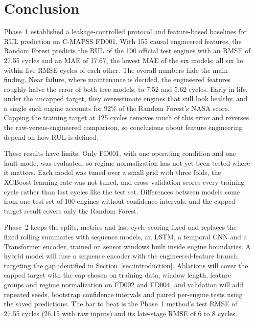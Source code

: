 
\section{Conclusion}
\label{sec:conclusion}

Phase~1 established a leakage-controlled protocol and feature-based baselines for
RUL prediction on C-MAPSS FD001. With 155 causal engineered features, the Random
Forest predicts the RUL of the 100 official test engines with an RMSE of 27.55
cycles and an MAE of 17.67, the lowest MAE of the six models; all six lie within
five RMSE cycles of each other. The overall numbers hide the main finding. Near
failure, where maintenance is decided, the engineered features roughly halve the
error of both tree models, to 7.52 and 5.62 cycles. Early in life, under the
uncapped target, they overestimate engines that still look healthy, and a single
such engine accounts for 92\% of the Random Forest's NASA score. Capping the
training target at 125 cycles removes much of this error and reverses the
raw-versus-engineered comparison, so conclusions about feature engineering
depend on how RUL is defined.

These results have limits. Only FD001, with one operating condition and one fault
mode, was evaluated, so regime normalization has not yet been tested where it
matters. Each model was tuned over a small grid with three folds, the XGBoost
learning rate was not tuned, and cross-validation scores every training cycle
rather than last cycles like the test set. Differences between models come from
one test set of 100 engines without confidence intervals, and the capped-target
result covers only the Random Forest.

Phase~2 keeps the splits, metrics and last-cycle scoring fixed and replaces the
fixed rolling summaries with sequence models, an LSTM, a temporal CNN and a
Transformer encoder, trained on sensor windows built inside engine boundaries.
A hybrid model will fuse a sequence encoder with the engineered-feature branch,
targeting the gap identified in Section~\ref{sec:introduction}. Ablations will
cover the capped target with the cap chosen on training data, window length,
feature groups and regime normalization on FD002 and FD004, and validation will
add repeated seeds, bootstrap confidence intervals and paired per-engine tests
using the saved predictions. The bar to beat is the Phase~1 method's test RMSE of
27.55 cycles (26.15 with raw inputs) and its late-stage RMSE of 6 to 8 cycles.
